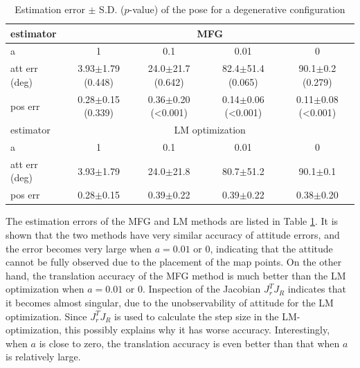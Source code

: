 \begin{table}
	\centering
	\caption{Estimation error $\pm$ S.D. ($p$-value) of the pose for a degenerative configuration}
	\label{tab:VIO-pose-error2}
	\footnotesize
	\begin{tabular}{l|cccc}
		\hline\hline
		estimator & \multicolumn{4}{c}{MFG} \\ \hline
		a & 1 & 0.1 & 0.01 & 0 \\ \hline
		att err (deg) & 3.93$\pm$1.79 (0.448) & 24.0$\pm$21.7 (0.642) & 82.4$\pm$51.4 (0.065) & 90.1$\pm$0.2 (0.279) \\
		pos err & 0.28$\pm$0.15 (0.339) & 0.36$\pm$0.20 (<0.001) & 0.14$\pm$0.06 (<0.001) & 0.11$\pm$0.08 (<0.001) \\
		\midrule[1.2pt]
		estimator & \multicolumn{4}{c}{LM optimization} \\ \hline
		a & 1 & 0.1 & 0.01 & 0 \\ \hline
		att err (deg) & 3.93$\pm$1.79 & 24.0$\pm$21.8 & 80.7$\pm$51.2 & 90.1$\pm$0.1 \\
		pos err & 0.28$\pm$0.15 & 0.39$\pm$0.22 & 0.39$\pm$0.22 & 0.38$\pm$0.20 \\
		\hline\hline
	\end{tabular}
\end{table}

The estimation errors of the MFG and LM methods are listed in Table \ref{tab:VIO-pose-error2}.
It is shown that the two methods have very similar accuracy of attitude errors, and the error becomes very large when $a = 0.01$ or 0, indicating that the attitude cannot be fully observed due to the placement of the map points.
On the other hand, the translation accuracy of the MFG method is much better than the LM optimization when $a = 0.01$ or 0.
Inspection of the Jacobian $J_r^TJ_R$ indicates that it becomes almost singular, due to the unobservability of attitude for the LM optimization.
Since $J_r^TJ_R$ is used to calculate the step size in the LM-optimization, this possibly explains why it has worse accuracy.
Interestingly, when $a$ is close to zero, the translation accuracy is even better than that when $a$ is relatively large.

